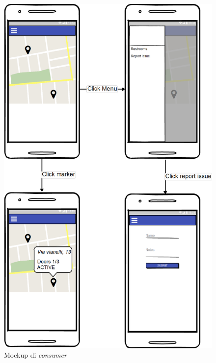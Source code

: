 \documentclass[12pt]{article}
\begin{document}
\begin{figure}[h!]
\centering
  \includegraphics[scale=0.21]{img/mockup-consumer.png}
  \caption{Mockup di \textit{consumer}}
\end{figure}
\newpage
\end{document}
